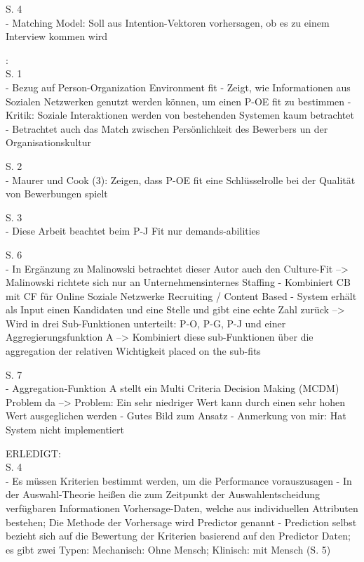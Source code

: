 S. 4\\
- Matching Model: Soll aus Intention-Vektoren vorhersagen, ob es zu einem Interview kommen wird

\textcite[S. 1ff.]{lu:2013}

\textcite{buettner:2014}:\\
S. 1\\
- Bezug auf Person-Organization Environment fit
- Zeigt, wie Informationen aus Sozialen Netzwerken genutzt werden können, um einen P-OE fit zu bestimmen
- Kritik: Soziale Interaktionen werden von bestehenden Systemen kaum betrachtet
- Betrachtet auch das Match zwischen Persönlichkeit des Bewerbers un der Organisationskultur

S. 2\\
- Maurer und Cook (3): Zeigen, dass P-OE fit eine Schlüsselrolle bei der Qualität von Bewerbungen spielt

S. 3\\
- Diese Arbeit beachtet beim P-J Fit nur demands-abilities

S. 6\\
- In Ergänzung zu Malinowski betrachtet dieser Autor auch den Culture-Fit --> Malinowski richtete sich nur an Unternehmensinternes Staffing
- Kombiniert CB mit CF für Online Soziale Netzwerke Recruiting / Content Based
- System erhält als Input einen Kandidaten und eine Stelle und gibt eine echte Zahl zurück --> Wird in drei Sub-Funktionen unterteilt: P-O, P-G, P-J und einer Aggregierungsfunktion A --> Kombiniert diese sub-Funktionen über die aggregation der relativen Wichtigkeit placed on the sub-fits

S. 7\\
- Aggregation-Funktion A stellt ein Multi Criteria Decision Making (MCDM) Problem da --> Problem: Ein sehr niedriger Wert kann durch einen sehr hohen Wert ausgeglichen werden
- Gutes Bild zum Ansatz
- Anmerkung von mir: Hat System nicht implementiert

\newpage
ERLEDIGT:
\textcite{faerber:2003}\\
S. 4\\
- Es müssen Kriterien bestimmt werden, um die Performance vorauszusagen
- In der Auswahl-Theorie heißen die zum Zeitpunkt der Auswahlentscheidung verfügbaren Informationen Vorhersage-Daten, welche aus individuellen Attributen bestehen; Die Methode der Vorhersage wird Predictor genannt
- Prediction selbst bezieht sich auf die Bewertung der Kriterien basierend auf den Predictor Daten; es gibt zwei Typen: Mechanisch: Ohne Mensch; Klinisch: mit Mensch (S. 5)

